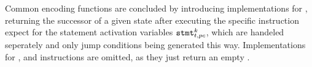 \noindent
Common encoding functions are concluded by introducing implementations for , returning the successor of a given state after executing the specific instruction expect for the statement activation variables $\texttt{stmt}^k_{t, pc}$, which are handeled seperately and only jump conditions being generated this way.
Implementations for ,  and  instructions are omitted, as they just return an empty .


\newcommand{\defencode}[1]{
  \vfill
  \par\noindent
  #1
  \par\noindent
  \rule[0.5\baselineskip]{\textwidth}{0.1pt}%
}

\newlength{\encodeskip}
\setlength{\encodeskip}{.5\baselineskip}



